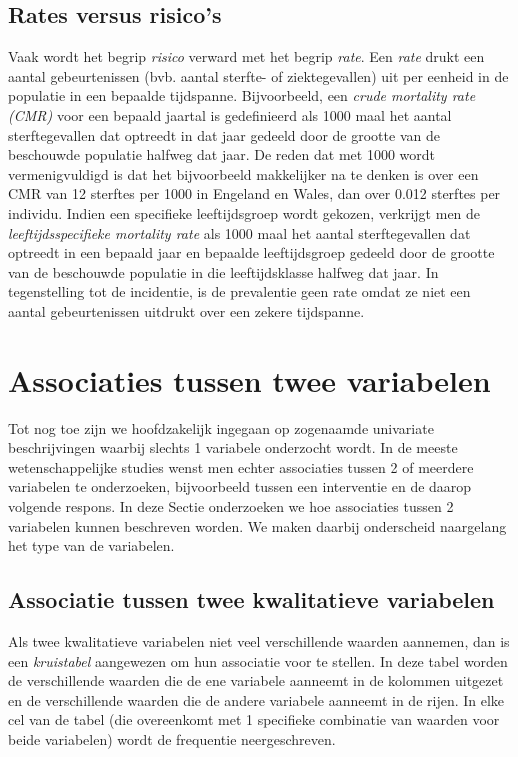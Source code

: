 \documentclass[12pt,dutch,coursenotes]{book}
\theoremstyle{definition}
\theoremstyle{definition}
\theoremstyle{definition}
\theoremstyle{remark}
\begin{document}
\subsection{Rates versus risico's}\label{rates-versus-risicos}

Vaak wordt het begrip \emph{risico} verward met het begrip \emph{rate}.
Een \emph{rate} drukt een aantal gebeurtenissen (bvb. aantal sterfte- of
ziektegevallen) uit per eenheid in de populatie in een bepaalde
tijdspanne. Bijvoorbeeld, een \emph{crude mortality rate (CMR)} voor een
bepaald jaartal is gedefinieerd als 1000 maal het aantal sterftegevallen
dat optreedt in dat jaar gedeeld door de grootte van de beschouwde
populatie halfweg dat jaar. De reden dat met 1000 wordt vermenigvuldigd
is dat het bijvoorbeeld makkelijker na te denken is over een CMR van 12
sterftes per 1000 in Engeland en Wales, dan over 0.012 sterftes per
individu. Indien een specifieke leeftijdsgroep wordt gekozen, verkrijgt
men de \emph{leeftijdsspecifieke mortality rate} als 1000 maal het
aantal sterftegevallen dat optreedt in een bepaald jaar en bepaalde
leeftijdsgroep gedeeld door de grootte van de beschouwde populatie in
die leeftijdsklasse halfweg dat jaar. In tegenstelling tot de
incidentie, is de prevalentie geen rate omdat ze niet een aantal
gebeurtenissen uitdrukt over een zekere tijdspanne.

\section{Associaties tussen twee
variabelen}\label{associaties-tussen-twee-variabelen}

Tot nog toe zijn we hoofdzakelijk ingegaan op zogenaamde univariate
beschrijvingen waarbij slechts 1 variabele onderzocht wordt. In de
meeste wetenschappelijke studies wenst men echter associaties tussen 2
of meerdere variabelen te onderzoeken, bijvoorbeeld tussen een
interventie en de daarop volgende respons. In deze Sectie onderzoeken we
hoe associaties tussen 2 variabelen kunnen beschreven worden. We maken
daarbij onderscheid naargelang het type van de variabelen.

\subsection{Associatie tussen twee kwalitatieve
variabelen}\label{subsec:kruistabel}

Als twee kwalitatieve variabelen niet veel verschillende waarden
aannemen, dan is een \emph{kruistabel} aangewezen om hun associatie voor
te stellen. In deze tabel worden de verschillende waarden die de ene
variabele aanneemt in de kolommen uitgezet en de verschillende waarden
die de andere variabele aanneemt in de rijen. In elke cel van de tabel
(die overeenkomt met 1 specifieke combinatie van waarden voor beide
variabelen) wordt de frequentie neergeschreven.
\end{document}

